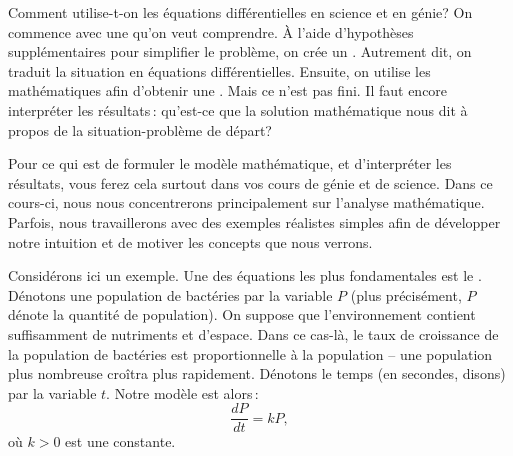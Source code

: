 Comment utilise-t-on les \'equations diff\'erentielles en science et en g\'enie?  On commence avec une \emph{} qu'on veut comprendre.  \`A l'aide d'hypoth\`eses suppl\'ementaires pour simplifier le probl\`eme, on cr\'ee un 
\emph{}.  Autrement dit, on traduit la situation en \'equations diff\'erentielles.  Ensuite, on utilise les math\'ematiques afin d'obtenir une \emph{}.  Mais ce n'est pas fini.  Il faut encore interpr\'eter les r\'esultats\,: qu'est-ce que la solution math\'ematique nous dit \`a propos de la situation-probl\`eme de d\'epart?

Pour ce qui est de formuler le mod\`ele math\'ematique, et d'interpr\'eter les r\'esultats, vous ferez cela surtout dans vos cours de g\'enie et de science.  Dans ce cours-ci, nous nous concentrerons principalement sur l'analyse math\'ematique.  Parfois, nous travaillerons avec des exemples r\'ealistes simples afin de d\'evelopper notre intuition et de motiver les concepts que nous verrons.

Consid\'erons ici un exemple.  Une des \'equations les plus fondamentales est le \emph{}.  D\'enotons une population de bact\'eries par la variable $P$ (plus pr\'ecis\'ement, $P$ d\'enote la quantit\'e de population).  On suppose que l'environnement contient suffisamment de nutriments et d'espace.  Dans ce cas-l\`a, le taux de croissance de la population de bact\'eries est proportionnelle \`a la population -- une population plus nombreuse cro\^itra plus rapidement.  D\'enotons le temps (en secondes, disons) par la variable $t$.  Notre mod\`ele est alors\,: 
%
\begin{equation*}
\frac{dP}{dt} = kP, 
\end{equation*}
o\`u $k > 0$ est une constante.

